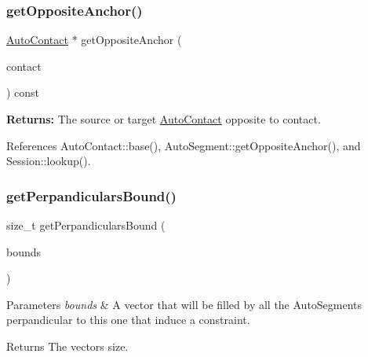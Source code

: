 \mbox{\label{classKatabatic_1_1AutoSegment_a2c5b0faacc768bf61e17eb72a4ccc248}} 
\subsubsection{\texorpdfstring{get\+Opposite\+Anchor()}{getOppositeAnchor()}\hspace{0.1cm}{\footnotesize\ttfamily [2/2]}}
{\footnotesize\ttfamily \hyperlink{classKatabatic_1_1AutoContact}{Auto\+Contact} $\ast$ get\+Opposite\+Anchor (\begin{DoxyParamCaption}\item[{\hyperlink{classKatabatic_1_1AutoContact}{Auto\+Contact} $\ast$}]{contact }\end{DoxyParamCaption}) const}

{\bfseries Returns\+:} The source or target \hyperlink{classKatabatic_1_1AutoContact}{Auto\+Contact} opposite to {\ttfamily contact}. 

References Auto\+Contact\+::base(), Auto\+Segment\+::get\+Opposite\+Anchor(), and Session\+::lookup().

\mbox{\label{classKatabatic_1_1AutoSegment_a206b53c34f57945b6c7bdb711101e38f}} 
\subsubsection{\texorpdfstring{get\+Perpandiculars\+Bound()}{getPerpandicularsBound()}}
{\footnotesize\ttfamily size\+\_\+t get\+Perpandiculars\+Bound (\begin{DoxyParamCaption}\item[{set$<$ \hyperlink{classKatabatic_1_1AutoSegment}{Auto\+Segment} $\ast$$>$ \&}]{bounds }\end{DoxyParamCaption})}


\begin{DoxyParams}{Parameters}
{\em bounds} & A vector that will be filled by all the Auto\+Segments perpandicular to this one that induce a constraint. \\
\hline
\end{DoxyParams}
\begin{DoxyReturn}{Returns}
The vector\textquotesingle{}s size. 
\end{DoxyReturn}


